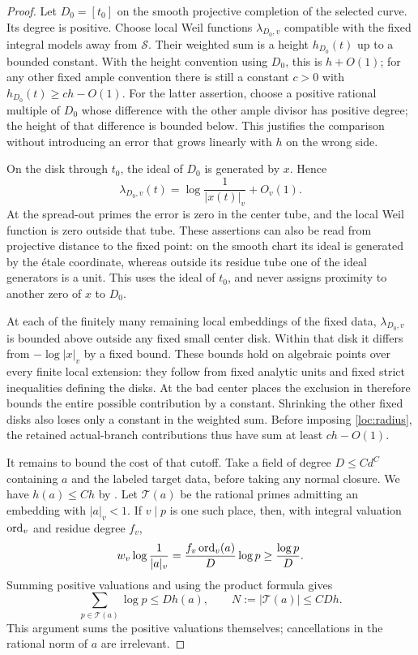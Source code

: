 \begin{proof}
Let $D_0=[t_0]$ on the smooth projective completion of the selected
curve.  Its degree is positive.  Choose local Weil functions
$\lambda_{D_0,v}$ compatible with the fixed integral models away from
$\mathcal S$.  Their weighted sum is a height $h_{D_0}(t)$ up to a
bounded constant.  With the height convention using $D_0$, this is
$h+O(1)$; for any other fixed ample convention there is still a
constant $c>0$ with $h_{D_0}(t)\geq ch-O(1)$.  For the latter assertion,
choose a positive rational multiple of $D_0$ whose difference with the
other ample divisor has positive degree; the height of that difference
is bounded below.  This justifies the comparison without introducing an
error that grows linearly with $h$ on the wrong side.

On the disk through $t_0$, the ideal of $D_0$ is generated by $x$.
Hence
\[
 \lambda_{D_0,v}(t)=\log\frac1{|x(t)|_v}+O_v(1).
\]
At the spread-out primes the error is zero in the center tube, and the
local Weil function is zero outside that tube.  These assertions can
also be read from projective distance to the fixed point: on the
smooth chart its ideal is generated by the \'etale coordinate, whereas
outside its residue tube one of the ideal generators is a unit.
This uses the ideal of $t_0$, and never assigns proximity to another
zero of $x$ to $D_0$.

At each of the finitely many remaining local embeddings of the fixed
data, $\lambda_{D_0,v}$ is bounded above outside any fixed small center
disk.  Within that disk it differs from $-\log|x|_v$ by a fixed bound.
These bounds hold on algebraic points over every finite local
extension: they follow from fixed analytic units and fixed strict
inequalities defining the disks.  At the bad center places the
exclusion in  therefore bounds the entire possible
contribution by a constant.  Shrinking the other fixed disks also loses
only a constant in the weighted sum.  Before imposing
\eqref{loc:radius}, the retained actual-branch contributions thus have
sum at least $ch-O(1)$.

It remains to bound the cost of that cutoff.  Take a field of degree
$D\leq Cd^C$ containing $a$ and the labeled target data, before taking
any normal closure.  We have $h(a)\leq Ch$ by
.  Let $\mathcal T(a)$ be the rational primes
admitting an embedding with $|a|_v<1$.  If $v\mid p$ is one such place,
then, with integral valuation $\operatorname{ord}_v$ and residue degree $f_v$,
\[
 w_v\log\frac1{|a|_v}
 =\frac{f_v\operatorname{ord}_v(a)}{D}\log p\geq\frac{\log p}{D}.
\]
Summing positive valuations and using the product formula gives
\begin{equation}\label{loc:prime-support}
 \sum_{p\in\mathcal T(a)}\log p\leq D h(a),
 \qquad N:=|\mathcal T(a)|\leq CDh.
\end{equation}
This argument sums the positive valuations themselves; cancellations
in the rational norm of $a$ are irrelevant.


\end{proof}
